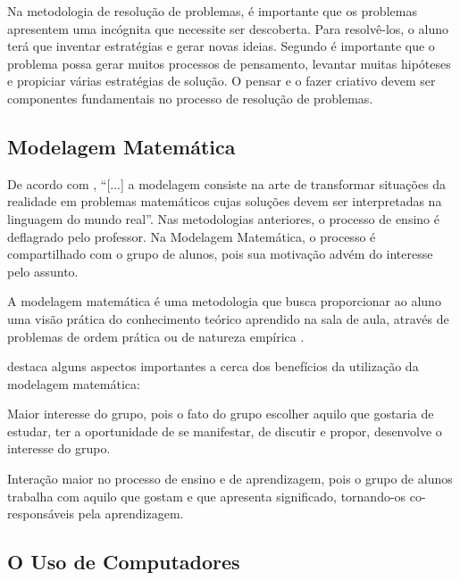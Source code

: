 Na metodologia de resolução de problemas, é importante que os problemas apresentem uma incógnita que necessite ser descoberta. Para resolvê-los, o aluno terá que inventar estratégias e gerar novas ideias. Segundo  é importante que o problema possa gerar muitos processos de pensamento, levantar muitas hipóteses e propiciar várias estratégias de solução. O pensar e o fazer criativo devem ser componentes fundamentais no processo de resolução de problemas.

\subsection{Modelagem Matemática}

De acordo com , “[...] a modelagem consiste na arte de transformar situações da realidade em problemas matemáticos cujas soluções devem ser interpretadas na linguagem do mundo real”. Nas metodologias anteriores, o processo de ensino é deflagrado pelo professor. Na Modelagem Matemática, o processo é compartilhado com o grupo de alunos, pois sua motivação advém
do interesse pelo assunto. 

A modelagem matemática é uma metodologia que busca proporcionar ao aluno uma visão prática do conhecimento teórico aprendido na sala de aula, através de problemas de ordem prática ou de natureza empírica \cite{fossa1998tendencias}. 

 destaca alguns aspectos importantes a cerca dos benefícios da utilização da modelagem matemática:

\begin{alineascomponto}
	\item Maior interesse do grupo, pois o fato do grupo escolher aquilo que gostaria de estudar, ter a oportunidade de se manifestar, de discutir e propor, desenvolve o interesse do grupo.
    \item Interação maior no processo de ensino e de aprendizagem, pois o grupo de alunos trabalha com aquilo que gostam e que apresenta significado, tornando-os co-responsáveis pela aprendizagem. 
\end{alineascomponto}


\subsection{O Uso de Computadores}

